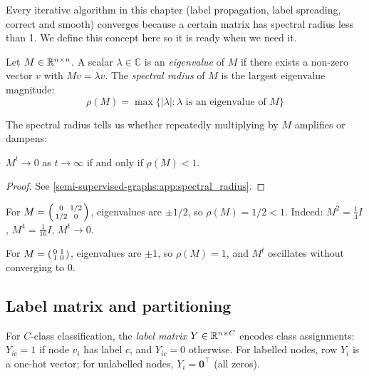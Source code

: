 \begin{notechapter}
Every iterative algorithm in this chapter (label propagation, label spreading,
correct and smooth) converges because a certain matrix has spectral radius less
than 1. We define this concept here so it is ready when we need it.

\begin{definition}
\label{semi-supervised-graphs:def:spectral_radius}
Let $M \in \mathbb{R}^{n \times n}$. A scalar $\lambda \in \mathbb{C}$ is an
\emph{eigenvalue} of $M$ if there exists a non-zero vector $v$ with
$Mv = \lambda v$. The \emph{spectral radius} of $M$ is the largest
eigenvalue magnitude:
\begin{equation}
\rho(M) = \max\{|\lambda| : \lambda \text{ is an eigenvalue of } M\}
\end{equation}
\end{definition}

The spectral radius tells us whether repeatedly multiplying by $M$ amplifies
or dampens:

\begin{proposition}
\label{semi-supervised-graphs:prop:spectral_powers}
$M^t \to 0$ as $t \to \infty$ if and only if $\rho(M) < 1$.
\end{proposition}

\begin{proof}
See \cref{semi-supervised-graphs:app:spectral_radius}.
\end{proof}

\begin{example}
For $M = \begin{psmallmatrix} 0 & 1/2 \\ 1/2 & 0 \end{psmallmatrix}$,
eigenvalues are $\pm 1/2$, so $\rho(M) = 1/2 < 1$. Indeed:
$M^2 = \frac{1}{4}I$, $M^4 = \frac{1}{16}I$, $M^t \to 0$.

For $M = \begin{psmallmatrix} 0 & 1 \\ 1 & 0 \end{psmallmatrix}$,
eigenvalues are $\pm 1$, so $\rho(M) = 1$, and $M^t$ oscillates without
converging to 0.
\end{example}

\subsection{Label matrix and partitioning}

\begin{definition}
\label{semi-supervised-graphs:def:label_matrix}
For $C$-class classification, the \emph{label matrix} $Y \in \mathbb{R}^{n \times C}$
encodes class assignments: $Y_{ic} = 1$ if node $v_i$ has label $c$, and
$Y_{ic} = 0$ otherwise. For labelled nodes, row $Y_i$ is a one-hot vector;
for unlabelled nodes, $Y_i = \mathbf{0}^\top$ (all zeros).
\end{definition}


\end{notechapter}
